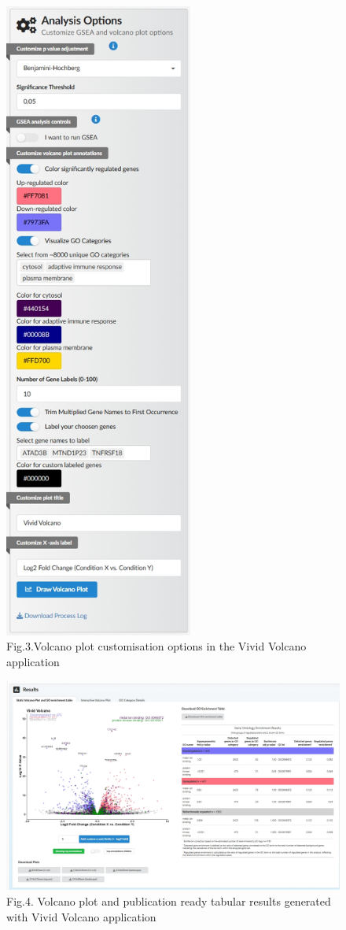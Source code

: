 \documentclass[
]{article}
\begin{document}
\begin{figure}
\centering
\includegraphics[width=2.4375in,height=\textheight]{Paper_figures/Volcano_plot_customisation_options.jpeg}
\caption{Fig.3.Volcano plot customisation options in the Vivid Volcano
application}
\end{figure}

\begin{figure}
\centering
\includegraphics{Paper_figures/Volcano.jpeg}
\caption{Fig.4. Volcano plot and publication ready tabular results
generated with Vivid Volcano application}
\end{figure}
\end{document}
